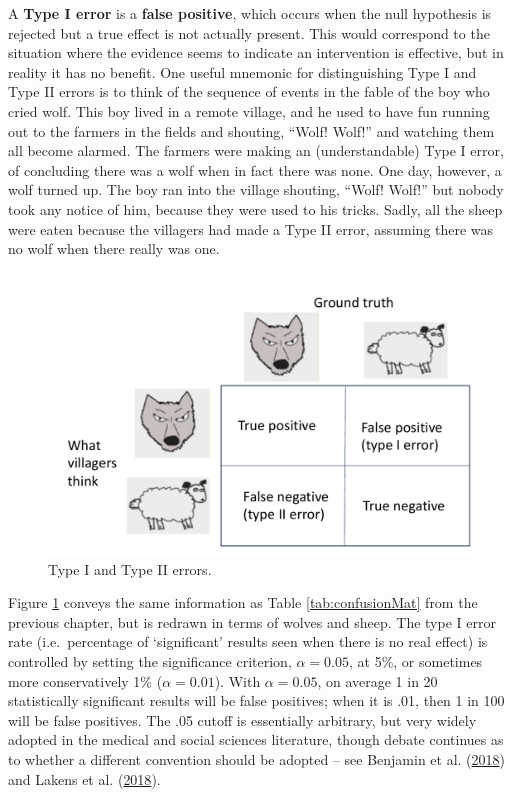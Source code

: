 \documentclass{krantz}
\begin{document}
A \textbf{Type I error} is a \textbf{false positive}, which occurs when the null hypothesis is rejected but a true effect is not actually present. This would correspond to the situation where the evidence seems to indicate an intervention is effective, but in reality it has no benefit. One useful mnemonic for distinguishing Type I and Type II errors is to think of the sequence of events in the fable of the boy who cried wolf. This boy lived in a remote village, and he used to have fun running out to the farmers in the fields and shouting, ``Wolf! Wolf!'' and watching them all become alarmed. The farmers were making an (understandable) Type I error, of concluding there was a wolf when in fact there was none. One day, however, a wolf turned up. The boy ran into the village shouting, ``Wolf! Wolf!'' but nobody took any notice of him, because they were used to his tricks. Sadly, all the sheep were eaten because the villagers had made a Type II error, assuming there was no wolf when there really was one.

\begin{figure}
\includegraphics[width=0.8\linewidth]{images_bw/wolfsheeprevised} \caption{Type I and Type II errors.}\label{fig:wolfsheepfig}
\end{figure}

Figure \ref{fig:wolfsheepfig} conveys the same information as Table \ref{tab:confusionMat} from the previous chapter, but is redrawn in terms of wolves and sheep. The type I error rate (i.e.~percentage of `significant' results seen when there is no real effect) is controlled by setting the significance criterion, \(\alpha=0.05\), at 5\%, or sometimes more conservatively 1\% (\(\alpha=0.01\)). With \(\alpha=0.05\), on average 1 in 20 statistically significant results will be false positives; when it is .01, then 1 in 100 will be false positives. The .05 cutoff is essentially arbitrary, but very widely adopted in the medical and social sciences literature, though debate continues as to whether a different convention should be adopted -- see Benjamin et al. (\protect\hyperlink{ref-benjamin2018}{2018}) and Lakens et al. (\protect\hyperlink{ref-lakens2018}{2018}).
\end{document}
